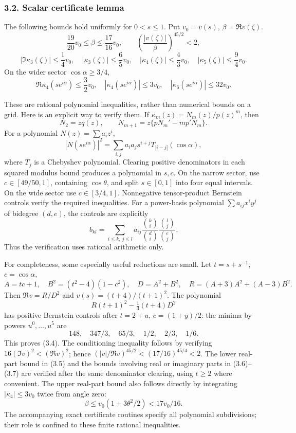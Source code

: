 \documentclass[
  11pt,
]{article}
\begin{document}
\subsubsection{3.2. Scalar certificate
lemma}\label{scalar-certificate-lemma}

The following bounds hold uniformly for \(0<s\le1\). Put \(v_0=v(s)\),
\(\beta=\Re v(\zeta)\). \[
 \frac{19}{20}v_0\le\beta\le\frac{17}{16}v_0,
 \qquad \left(\frac{|v(\zeta)|}{\beta}\right)^{45/2}<2,             \tag{3.5}
\] \[
 |\Im\kappa_3(\zeta)|\le\frac14v_0,
 \quad |\kappa_3(\zeta)|\le\frac65v_0,
 \quad |\kappa_4(\zeta)|\le\frac43v_0,
 \quad |\kappa_5(\zeta)|\le\frac94v_0.                            \tag{3.6}
\] On the wider sector \(\cos\alpha\ge3/4\), \[
 \Re\kappa_4(s e^{i\alpha})\le\frac32v_0,
 \quad |\kappa_4(s e^{i\alpha})|\le3v_0,
 \quad |\kappa_6(s e^{i\alpha})|\le32v_0.                        \tag{3.7}
\]

These are rational polynomial inequalities, rather than numerical bounds
on a grid. Here is an explicit way to verify them. If
\(\kappa_m(z)=N_m(z)/p(z)^m\), then \[
 N_2=zq(z),\qquad N_{m+1}=z\{pN_m'-m p'N_m\}.                   \tag{3.8}
\] For a polynomial \(N(z)=\sum a_i z^i\), \[
 |N(s e^{i\alpha})|^2
 =\sum_{i,j}a_i a_j s^{i+j}T_{|i-j|}(\cos\alpha),               \tag{3.9}
\] where \(T_j\) is a Chebyshev polynomial. Clearing positive
denominators in each squared modulus bound produces a polynomial in
\(s,c\). On the narrow sector, use \(c\in[49/50,1]\), containing
\(\cos\theta\), and split \(s\in[0,1]\) into four equal intervals. On
the wide sector use \(c\in[3/4,1]\). Nonnegative tensor-product
Bernstein controls verify the required inequalities. For a power-basis
polynomial \(\sum a_{ij}x^iy^j\) of bidegree \((d,e)\), the controls are
explicitly \[
 b_{kl}=\sum_{i\le k,\,j\le l}
 a_{ij}\frac{\binom{k}{i}}{\binom d i}
        \frac{\binom l j}{\binom e j}.                           \tag{3.10}
\] Thus the verification uses rational arithmetic only.

For completeness, some especially useful reductions are small. Let
\(t=s+s^{-1}\), \(c=\cos\alpha\), \[
 A=tc+1,\quad B^2=(t^2-4)(1-c^2),\quad D=A^2+B^2,
 \quad R=(A+3)A^2+(A-3)B^2.
\] Then \(\Re v=R/D^2\) and \(v(s)=(t+4)/(t+1)^2\). The polynomial \[
 R(t+1)^2-\tfrac13(t+4)D^2
\] has positive Bernstein controls after \(t=2+u\), \(c=(1+y)/2\): the
minima by powers \(u^0,\ldots,u^5\) are \[
 148,\quad347/3,\quad65/3,\quad1/2,\quad2/3,\quad1/6.
\] This proves (3.4). The conditioning inequality follows by verifying
\(16(\Im v)^2<(\Re v)^2\); hence
\((|v|/\Re v)^{45/2}<(17/16)^{45/4}<2\). The lower real-part bound in
(3.5) and the bounds involving real or imaginary parts in (3.6)--(3.7)
are verified after the same denominator clearing, using \(t\ge2\) where
convenient. The upper real-part bound also follows directly by
integrating \(|\kappa_4|\le3v_0\) twice from angle zero: \[
 \beta\le v_0(1+3\theta^2/2)<17v_0/16.
\] The accompanying exact certificate routines specify all polynomial
subdivisions; their role is confined to these finite rational
inequalities.
\end{document}
